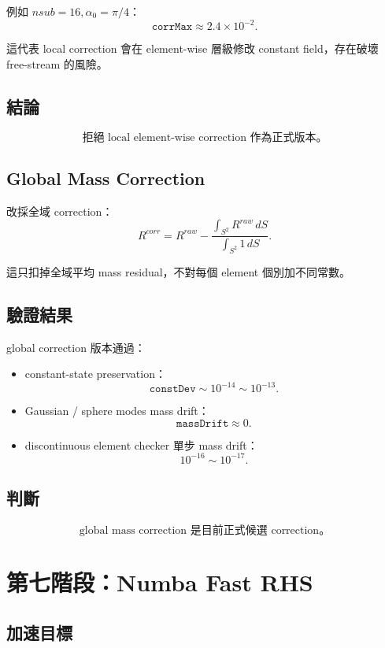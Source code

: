 \documentclass[UTF8,12pt,a4paper]{ctexart}
\begin{document}
例如 $nsub=16,\alpha_0=\pi/4$：
\[
\texttt{corrMax}\approx2.4\times10^{-2}.
\]

這代表 local correction 會在 element-wise 層級修改 constant field，存在破壞 free-stream 的風險。

\subsection{結論}

\[
\boxed{
\text{拒絕 local element-wise correction 作為正式版本。}
}
\]

\subsection{Global Mass Correction}

改採全域 correction：
\[
R^{corr}
=
R^{raw}
-
\frac{\int_{S^2}R^{raw}\,dS}
{\int_{S^2}1\,dS}.
\]

這只扣掉全域平均 mass residual，不對每個 element 個別加不同常數。

\subsection{驗證結果}

global correction 版本通過：
\begin{itemize}
  \item constant-state preservation：
  \[
  \texttt{constDev}\sim10^{-14}\sim10^{-13}.
  \]
  \item Gaussian / sphere modes mass drift：
  \[
  \texttt{massDrift}\approx0.
  \]
  \item discontinuous element checker 單步 mass drift：
  \[
  10^{-16}\sim10^{-17}.
  \]
\end{itemize}

\subsection{判斷}

\[
\boxed{
\text{global mass correction 是目前正式候選 correction。}
}
\]

\section{第七階段：Numba Fast RHS}

\subsection{加速目標}
\end{document}
